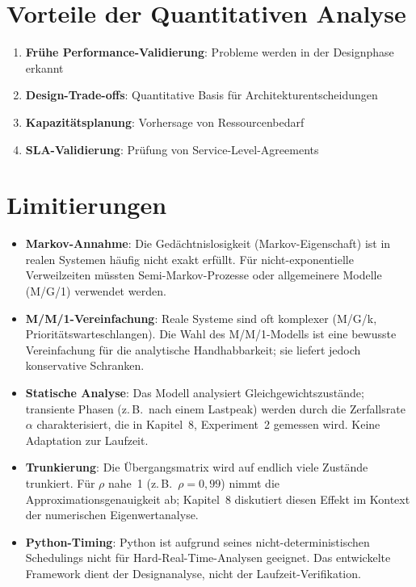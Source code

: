 ﻿\documentclass[a4paper,12pt]{report}
\theoremstyle{definition}
\begin{document}
\section{Vorteile der Quantitativen Analyse}

\begin{enumerate}
	\item[-] \textbf{Frühe Performance-Validierung}: Probleme werden in der Designphase erkannt
	\item[-] \textbf{Design-Trade-offs}: Quantitative Basis für Architekturentscheidungen
	\item[-] \textbf{Kapazitätsplanung}: Vorhersage von Ressourcenbedarf
	\item[-] \textbf{SLA-Validierung}: Prüfung von Service-Level-Agreements
\end{enumerate}

\section{Limitierungen}

\begin{itemize}
	\item[-] \textbf{Markov-Annahme}: Die Gedächtnislosigkeit (Markov-Eigenschaft)
	ist in realen Systemen häufig nicht exakt erfüllt.  Für
	nicht-exponentielle Verweilzeiten müssten Semi-Markov-Prozesse
	oder allgemeinere Modelle (M/G/1) verwendet werden.
	
	\item[-] \textbf{M/M/1-Vereinfachung}: Reale Systeme sind oft komplexer
	(M/G/k, Prioritätswarteschlangen).  Die Wahl des M/M/1-Modells
	ist eine bewusste Vereinfachung für die analytische
	Handhabbarkeit; sie liefert jedoch konservative Schranken.
	
	\item[-] \textbf{Statische Analyse}: Das Modell analysiert
	Gleichgewichtszustände; transiente Phasen (z.\,B.\ nach einem
	Lastpeak) werden durch die Zerfallsrate~$\alpha$ charakterisiert,
	die in Kapitel~8, Experiment~2 gemessen wird.  Keine Adaptation
	zur Laufzeit.
	
	\item[-] \textbf{Trunkierung}: Die Übergangsmatrix wird auf endlich viele
	Zustände trunkiert.  Für $\rho$ nahe~1 (z.\,B.\ $\rho = 0{,}99$)
	nimmt die Approximationsgenauigkeit ab; Kapitel~8 diskutiert
	diesen Effekt im Kontext der numerischen Eigenwertanalyse.
	
	\item[-] \textbf{Python-Timing}: Python ist aufgrund seines
	nicht-deterministischen Schedulings nicht für Hard-Real-Time-Analysen
	geeignet.  Das entwickelte Framework dient der Designanalyse, nicht
	der Laufzeit-Verifikation.
\end{itemize}
\end{document}
